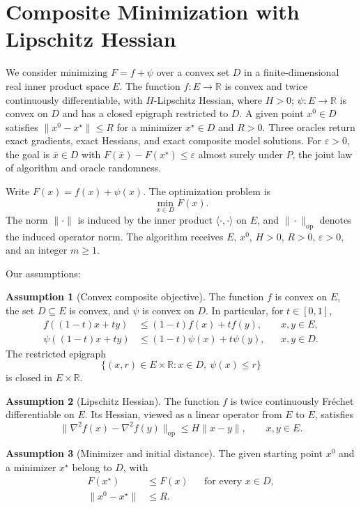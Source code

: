 \documentclass[10pt]{article}
\theoremstyle{definition}
\newtheorem{assumption}{Assumption}
\begin{document}
\section*{Composite Minimization with Lipschitz Hessian}
We consider minimizing $F=f+\psi$ over a convex set $D$ in a finite-dimensional real inner product space $E$. The function $f:E\to\mathbb{R}$ is convex and twice continuously differentiable, with $H$-Lipschitz Hessian, where $H>0$; $\psi:E\to\mathbb{R}$ is convex on $D$ and has a closed epigraph restricted to $D$. A given point $x^0\in D$ satisfies $\|x^0-x^\star\|\leq R$ for a minimizer $x^\star\in D$ and $R>0$. Three oracles return exact gradients, exact Hessians, and exact composite model solutions. For $\varepsilon>0$, the goal is $\bar{x}\in D$ with $F(\bar{x})-F(x^\star)\leq\varepsilon$ almost surely under $P$, the joint law of algorithm and oracle randomness.

Write $F(x)=f(x)+\psi(x)$. The optimization problem is
\[
\min_{x\in D} F(x).
\]
The norm $\|\cdot\|$ is induced by the inner product $\langle\cdot,\cdot\rangle$ on $E$, and $\|\cdot\|_{\mathrm{op}}$ denotes the induced operator norm. The algorithm receives $E$, $x^0$, $H>0$, $R>0$, $\varepsilon>0$, and an integer $m\geq 1$.

Our assumptions:
\begin{assumption}[Convex composite objective]
The function $f$ is convex on $E$, the set $D\subseteq E$ is convex, and $\psi$ is convex on $D$. In particular, for $t\in[0,1]$,
\[
\begin{aligned}
f((1-t)x+ty)&\leq (1-t)f(x)+tf(y),
&&x,y\in E,\\
\psi((1-t)x+ty)&\leq (1-t)\psi(x)+t\psi(y),
&&x,y\in D.
\end{aligned}
\]
The restricted epigraph
\[
\{(x,r)\in E\times\mathbb{R}:x\in D,\ \psi(x)\leq r\}
\]
is closed in $E\times\mathbb{R}$.
\end{assumption}

\begin{assumption}[Lipschitz Hessian]
The function $f$ is twice continuously Fr\'echet differentiable on $E$. Its Hessian, viewed as a linear operator from $E$ to $E$, satisfies
\[
\|\nabla^2 f(x)-\nabla^2 f(y)\|_{\mathrm{op}}
\leq H\|x-y\|,
\qquad x,y\in E.
\]
\end{assumption}

\begin{assumption}[Minimizer and initial distance]
The given starting point $x^0$ and a minimizer $x^\star$ belong to $D$, with
\[
\begin{aligned}
F(x^\star)&\leq F(x) &&\text{for every }x\in D,\\
\|x^0-x^\star\|&\leq R.
\end{aligned}
\]
\end{assumption}
\end{document}
